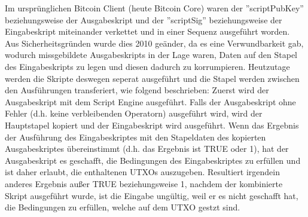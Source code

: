 Im ursprünglichen Bitcoin Client (heute Bitcoin Core) waren der ''scriptPubKey'' beziehungsweise der Ausgabeskript und der 
''scriptSig'' beziehungsweise der Eingabeskript miteinander verkettet und in einer Sequenz ausgeführt worden. Aus 
Sicherheitsgründen wurde dies 2010 geänder, da es eine Verwundbarkeit gab, wodurch missgebildete Ausgabeskripts in der 
Lage waren, Daten auf den Stapel des Eingabeskripts zu legen und diesen dadurch zu korrumpieren. Heutzutage werden die Skripte
deswegen seperat ausgeführt und die Stapel werden zwischen den Ausführungen transferiert, wie folgend beschrieben: Zuerst wird
der Ausgabeskript mit dem Script Engine ausgeführt. Falls der Ausgabeskript ohne Fehler (d.h. keine verbleibenden Operatorn)
ausgeführt wird, wird der Hauptstapel kopiert und der Eingabeskript wird ausgeführt. Wenn das Ergebnis der Ausführung des 
Eingabeskriptes mit den Stapeldaten des kopierten Ausgabeskriptes übereinstimmt (d.h. das Ergebnis ist TRUE oder 1), hat der 
Ausgabeskript es geschafft, die Bedingungen des Eingabeskriptes zu erfüllen und ist daher erlaubt, die enthaltenen UTXOs
auszugeben. Resultiert irgendein anderes Ergebnis außer TRUE beziehungsweise 1, nachdem der kombinierte Skript ausgeführt wurde,
ist die Eingabe ungültig, weil er es nicht geschafft hat, die Bedingungen zu erfüllen, welche auf dem UTXO gestzt sind.